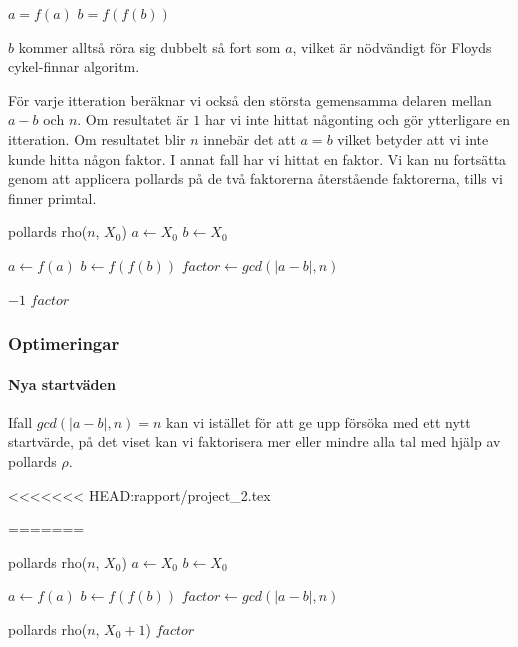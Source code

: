\documentclass[a4paper,12pt]{article}
\renewcommand{\*}{\ensuremath{\cdot}}
\begin{document}
$a = f(a)$
$b = f(f(b))$

$b$ kommer alltså röra sig dubbelt så fort som $a$, vilket är nödvändigt för Floyds cykel-finnar algoritm.

För varje itteration beräknar vi också den största gemensamma delaren mellan $a-b$ och $n$. Om resultatet är $1$ har vi inte hittat någonting och gör ytterligare en itteration. Om resultatet blir $n$ innebär det att $a=b$ vilket betyder att vi inte kunde hitta någon faktor. I annat fall har vi hittat en faktor. Vi kan nu fortsätta genom att applicera pollards på de två faktorerna återstående faktorerna, tills vi finner primtal.

\begin{algorithmic}
    \STATE pollards rho($n$, $X_0$)
        \STATE $a \gets X_0 $
        \STATE $b \gets X_0 $

            \STATE $a \gets f(a)$
            \STATE $b \gets f(f(b))$
            \STATE $factor \gets gcd(|a-b|, n)$
        \ENDWHILE

            \STATE {}
            \RETURN $-1$ 
            \RETURN $factor$
        \ENDIF
\end{algorithmic}


\subsubsection{Optimeringar}
\paragraph{Nya startväden}

Ifall $gcd(|a-b|, n) = n$ kan vi istället för att ge upp försöka med ett nytt startvärde, på det viset kan vi faktorisera mer eller mindre alla tal med hjälp av pollards $\rho$.

<<<<<<< HEAD:rapport/project_2.tex

%    
=======
\begin{algorithmic}
    \STATE pollards rho($n$, $X_0$)
        \STATE $a \gets X_0 $
        \STATE $b \gets X_0 $

            \STATE $a \gets f(a)$
            \STATE $b \gets f(f(b))$
            \STATE $factor \gets gcd(|a-b|, n)$
        \ENDWHILE

            \STATE {}
            \RETURN pollards rho($n$, $X_0+1$) 
            \RETURN $factor$
        \ENDIF
\end{algorithmic}
\end{document}
